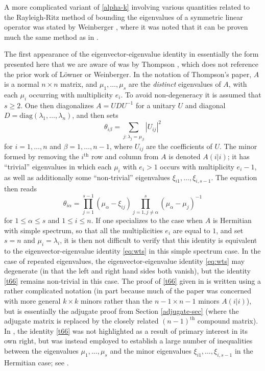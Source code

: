 \documentclass[12pt]{amsart}
\begin{document}
A more complicated variant of \eqref{alpha-k} involving various quantities related to the Rayleigh-Ritz method of bounding the eigenvalues of a symmetric linear operator was stated by Weinberger \cite[(2.29)]{weinberger}, where it was noted that it can be proven much the same method as in \cite{Lowner}.  

The first appearance of the eigenvector-eigenvalue identity in essentially the form presented here that we are aware of was by Thompson \cite[(15)]{Thompson:1966}, which does not reference the prior work of L\"owner or Weinberger.  In the notation of Thompson's paper, $A$ is a normal $n \times n$ matrix, and $\mu_1,\dots,\mu_s$ are the \emph{distinct} eigenvalues of $A$, with each $\mu_i$ occurring with multiplicity $e_i$.  To avoid non-degeneracy it is assumed that $s \geq 2$.	One then diagonalizes $A = UDU^{-1}$ for a unitary $U$ and diagonal $D = \mathrm{diag}(\lambda_1,\dots,\lambda_n)$, and then sets
$$ \theta_{i\beta} = \sum_{j: \lambda_j = \mu_\beta} |U_{ij}|^2$$
for $i=1,\dots,n$ and $\beta=1,\dots,n-1$, where $U_{ij}$ are the coefficients of $U$. The minor formed by removing the $i^{\mathrm{th}}$ row and column from $A$ is denoted $A(i|i)$; it has ``trivial'' eigenvalues in which each $\mu_i$ with $e_i>1$ occurs with multiplicity $e_i-1$, as well as additionally some ``non-trivial'' eigenvalues $\xi_{i1},\dots,\xi_{i,s-1}$.  The equation \cite[(15)]{Thompson:1966} then reads
\begin{equation}\label{t66}
 \theta_{i\alpha} = \prod_{j=1}^{s-1} (\mu_\alpha - \xi_{ij}) \prod_{j=1,j \neq \alpha}^s (\mu_\alpha - \mu_j)^{-1}
\end{equation}
for $1 \leq \alpha \leq s$ and $1 \leq i \leq n$.  If one specializes to the case when $A$ is Hermitian with simple spectrum, so that all the multiplicities $e_i$ are equal to $1$, and set $s=n$ and $\mu_i = \lambda_i$, it is then not difficult to verify that this identity is equivalent to the eigenvector-eigenvalue identity \eqref{eq:wts} in this simple spectrum case. In the case of repeated eigenvalues, the eigenvector-eigenvalue identity \eqref{eq:wts} may degenerate (in that the left and right hand sides both vanish), but the identity \eqref{t66} remains non-trivial in this case.  The proof of \eqref{t66} given in \cite{Thompson:1966} is written using a rather complicated notation (in part because much of the paper was concerned with more general $k \times k$ minors rather than the $n-1 \times n-1$ minors $A(i|i)$), but is essentially the adjugate proof from Section \ref{adjugate-sec} (where the adjugate matrix is replaced by the closely related $(n-1)^{\mathrm{th}}$ compound matrix).  In \cite{Thompson:1966}, the identity \eqref{t66} was not highlighted as a result of primary interest in its own right, but was instead employed to establish a large number of inequalities between the eigenvalues $\mu_1,\dots,\mu_s$ and the minor eigenvalues $\xi_{i1},\dots,\xi_{i,s-1}$ in the Hermitian case; see \cite[Section 5]{Thompson:1966}.
\end{document}
